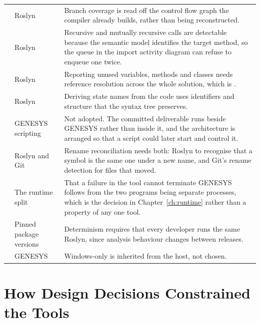 \begin{longtable}{L{0.14\textwidth}L{0.33\textwidth}L{0.43\textwidth}}
	 & Roslyn & Branch coverage is read off the control flow graph the
	compiler already builds, rather than being reconstructed. \\
	\addlinespace

	 & Roslyn & Recursive and mutually recursive calls are detectable
	because the semantic model identifies the target method, so the queue in the
	import activity diagram can refuse to enqueue one twice. \\
	\addlinespace

	 & Roslyn & Reporting unused variables, methods and classes needs
	reference resolution across the whole solution, which is
	. \\
	\addlinespace

	 & Roslyn & Deriving state names from the code uses identifiers and
	structure that the syntax tree preserves. \\
	\addlinespace

	 & GENESYS scripting & Not adopted. The committed deliverable runs
	beside GENESYS rather than inside it, and the architecture is arranged so that
	a script could later start and control it. \\
	\addlinespace

	 & Roslyn and Git & Rename reconciliation needs both: Roslyn to
	recognise that a symbol is the same one under a new name, and Git's rename
	detection for files that moved. \\
	\addlinespace

	 & The runtime split & That a failure in the tool cannot terminate
	GENESYS follows from the two programs being separate processes, which is the
	decision in Chapter~\ref{ch:runtime} rather than a property of any one
	tool. \\
	\addlinespace

	 & Pinned package versions & Determinism requires that every
	developer runs the same Roslyn, since analysis behaviour changes between
	releases. \\
	\addlinespace

	 & GENESYS & Windows-only is inherited from the host, not
	chosen. \\
	\bottomrule
\end{longtable}

\section{How Design Decisions Constrained the Tools}

